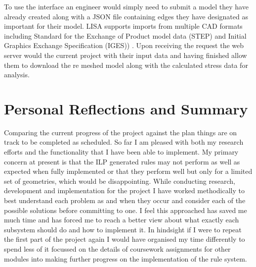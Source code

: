 \noindent
To use the interface an engineer would simply need to submit a model they have already created  along with a JSON file containing edges they have designated as important for their model. LISA supports imports from multiple CAD formats including Standard for the Exchange of Product model data (STEP) and Initial Graphics Exchange Specification (IGES)) \cite{LISAManual}. Upon receiving the request the web server would the current project with their input data and having finished allow them to download the re meshed model along with the calculated stress data for analysis.


\section{Personal Reflections and Summary}
Comparing the current progress of the project against the plan things are on track to be completed as scheduled. So far I am pleased with both my research efforts and the functionality that I have been able to implement. My primary concern at present is that the ILP generated rules may not perform as well as expected when fully implemented or that they perform well but only for a limited set of geometries, which would be disappointing. While conducting research, development and implementation for the project I have worked methodically to best understand each problem as and when they occur and consider each of the possible solutions before committing to one. I feel this approached has saved me much time and has forced me to reach a better view about what exactly each subsystem should do and how to implement it. In hindsight if I were to repeat the first part of the project again I would have organised my time differently to spend less of it focussed on the details of coursework assignments for other modules into making further progress on the implementation of the rule system.






